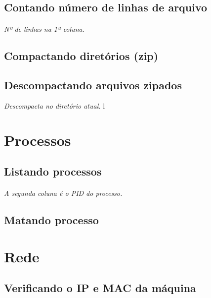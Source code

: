 \documentclass[a4paper,9pt]{extarticle}
\begin{document}
\begin{multicols}{2}
\subsection{Contando número de linhas de arquivo}
	
	\paragraph{} \emph{Nº de linhas na 1ª coluna.}
	
\subsection{Compactando diretórios (zip)}
	

\subsection{Descompactando arquivos zipados}
	
	 \emph{Descompacta no diretório atual.}
l
\section{Processos}
\subsection{Listando processos}
	
	\paragraph{} \emph{A segunda coluna é o PID do processo.} 
	
\subsection{Matando processo}
%
\section{Rede}
\subsection{Verificando o IP e MAC da máquina}

	

\end{multicols}
\end{document}
